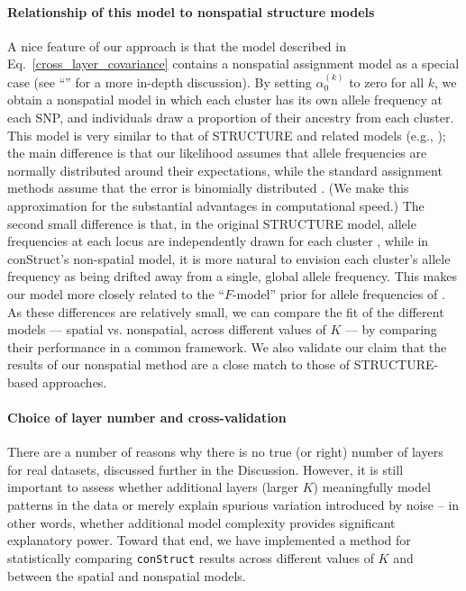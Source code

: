 \documentclass[10pt,letterpaper]{article}
\newcommand{\secref}[1]{``\nameref{#1}''}
\begin{document}
\paragraph{Relationship of this model to nonspatial structure models}

A nice feature of our approach is that the model described in Eq.\ \eqref{cross_layer_covariance} 
contains a nonspatial assignment model as a special case 
(see \secref{model_app} for a more in-depth discussion). 
By setting $\alpha_0^{(k)}$ to zero for all $k$, 
we obtain a nonspatial model in which each cluster has its own allele frequency at each SNP, 
and individuals draw a proportion of their ancestry from each cluster. 
This model is very similar to that of STRUCTURE \cite{STRUCTURE} 
and related models (e.g., \cite{ADMIXTURE}); 
the main difference is that our likelihood assumes that allele frequencies are normally distributed 
around their expectations, 
while the standard assignment methods assume that the error is binomially distributed \cite{Engelhardt2012}.  
(We make this approximation for the substantial advantages in
computational speed.)
The second small difference is that, in the original STRUCTURE model, 
allele frequencies at each locus are independently drawn for each 
cluster \cite{STRUCTURE}, while in conStruct's non-spatial model, 
it is more natural to envision each cluster's allele frequency 
as being drifted away from a single, global allele frequency. 
This makes our model more
closely related to the ``$F$-model'' prior for allele frequencies of \cite{falush2003}.
As these differences are relatively small, we can compare the fit of the different models 
--- spatial vs. nonspatial, across different values of $K$ --- 
by comparing their performance in a common framework. 
We also validate our claim that the results of our nonspatial method 
are a close match to those of STRUCTURE-based approaches.

\paragraph{Choice of layer number and cross-validation}
There are a number of reasons 
why there is no true (or right) number of layers for real datasets,
discussed further in the Discussion.
However, it is still important to assess whether additional layers (larger $K$)
meaningfully model patterns in the data
or merely explain spurious variation introduced by noise
-- in other words, whether additional model complexity
provides significant explanatory power.
Toward that end, we have implemented a method for 
statistically comparing \texttt{conStruct} results across different values of $K$ 
and between the spatial and nonspatial models.
\end{document}
